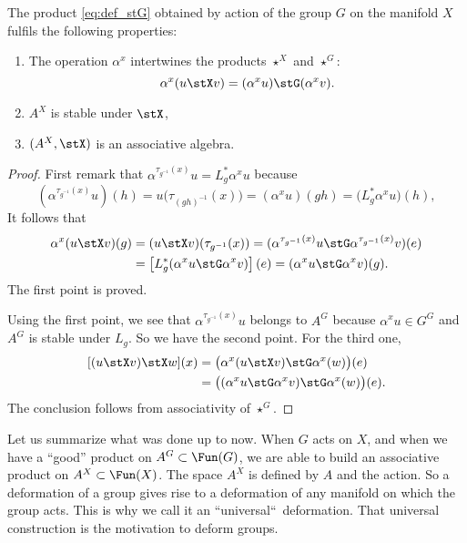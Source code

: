 \begin{theorem}
	The product \eqref{eq:def_stG} obtained by action of the group $G$ on the manifold $X$ fulfils the following properties:
	\begin{enumerate}
		\item\label{itemthostG} The operation $\alpha^x$ intertwines the products $\star^X$ and $\star^G$:
		\[
			\alpha^x(u\stX v)=(\alpha^xu)\stG(\alpha^xv).
		\]

		\item $A^X$ is stable under $\stX$,
		\item $(A^X,\stX)$ is an associative algebra.
	\end{enumerate}
\end{theorem}


\begin{proof}
	First remark that $\alpha^{\tau_{g^{-1}}(x)}u=L^*_g\alpha^xu$ because
	\[
		(\alpha^{\tau_{g^{-1}}(x)}u)(h)=u\big(\tau_{(gh)^{-1}}(x)\big)=(\alpha^xu)(gh)
		=\big(L^*_g\alpha^xu\big)(h),
	\]
	It follows that
	\begin{equation}
		\begin{split}
			\alpha^x(u\stX v)(g)&=(u\stX v)(\tau_{g^{-1}}(x))
			=(\alpha^{\tau_{g^{-1}}(x)}u\stG\alpha^{\tau_{g^{-1}}(x)}v) (e)\\
			&=\left[ L^*_g(\alpha^xu\stG\alpha^xv) \right](e)
			=(\alpha^xu\stG\alpha^xv)(g).
		\end{split}
	\end{equation}
	The first point is proved.

	Using the first point, we see that $\alpha^{\tau_{g^{-1}}(x)}u$ belongs to $A^G$ because $\alpha^xu\in G^G$ and $A^G$ is stable under $L_g$. So we have the second point.  For the third one,
	\[
		\begin{split}
			[(u\stX v)\stX w](x)&=\big(\alpha^x(u\stX v)\stG\alpha^x(w)\big)(e)\\
			&=\big((\alpha^xu\stG\alpha^xv)\stG\alpha^x(w)\big)(e).
		\end{split}
	\]
	The conclusion follows from associativity of $\star^G$.
\end{proof}

Let us summarize what was done up to now. When $G$ acts on $X$, and when we have a ``good'' product on $A^G\subset\Fun(G)$, we are able to build an associative product on $A^X\subset\Fun(X)$. The space $A^X$ is defined by $A$ and the action. So a deformation of a group gives rise to a deformation of any manifold on which the group acts. This is why we call it an ``universal``\ deformation. That universal construction is the motivation to deform groups.

